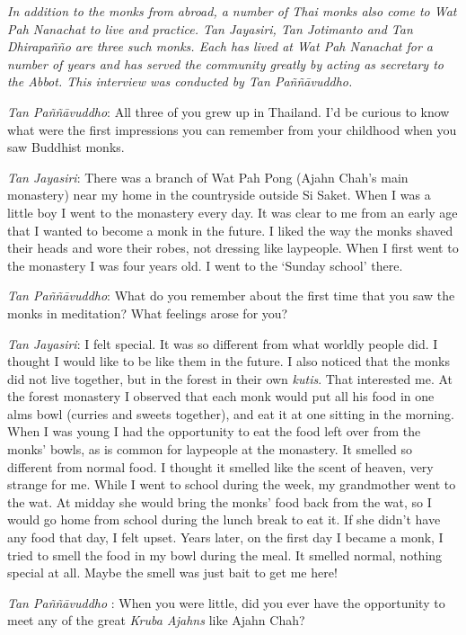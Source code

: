 
\emph{In addition to the monks from abroad, a number of Thai monks also
come to Wat Pah Nanachat to live and practice. Tan Jayasiri, Tan
Jotimanto and Tan Dhirapañño are three such monks. Each has lived at Wat
Pah Nanachat for a number of years and has served the community greatly
by acting as secretary to the Abbot. This interview was conducted by Tan
Paññāvuddho.}

\emph{Tan Paññāvuddho}: All three of you grew up in Thailand. I'd be
curious to know what were the first impressions you can remember from
your childhood when you saw Buddhist monks.

\emph{Tan Jayasiri}: There was a branch of Wat Pah Pong (Ajahn Chah's
main monastery) near my home in the countryside outside Si Saket. When I
was a little boy I went to the monastery every day. It was clear to me
from an early age that I wanted to become a monk in the future. I liked
the way the monks shaved their heads and wore their robes, not dressing
like laypeople. When I first went to the monastery I was four years old.
I went to the `Sunday school' there.

\emph{Tan Paññāvuddho}: What do you remember about the first time that
you saw the monks in meditation? What feelings arose for you?

\emph{Tan Jayasiri}: I felt special. It was so different from what
worldly people did. I thought I would like to be like them in the
future. I also noticed that the monks did not live together, but in the
forest in their own \emph{kutis}. That interested me. At the forest
monastery I observed that each monk would put all his food in one alms
bowl (curries and sweets together), and eat it at one sitting in the
morning. When I was young I had the opportunity to eat the food left
over from the monks' bowls, as is common for laypeople at the monastery.
It smelled so different from normal food. I thought it smelled like the
scent of heaven, very strange for me. While I went to school during the
week, my grandmother went to the wat. At midday she would bring the
monks' food back from the wat, so I would go home from school during the
lunch break to eat it. If she didn't have any food that day, I felt
upset. Years later, on the first day I became a monk, I tried to smell
the food in my bowl during the meal. It smelled normal, nothing special
at all. Maybe the smell was just bait to get me here!

\emph{Tan Paññāvuddho} : When you were little, did you ever have the
opportunity to meet any of the great \emph{Kruba Ajahns  } like Ajahn
Chah?

